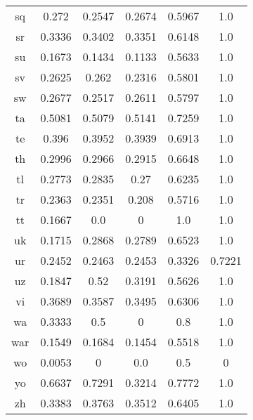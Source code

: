 \begin{figure}[h]
\begin{tabular}{cccccc}
sq&0.272&0.2547&0.2674&0.5967&1.0\\
sr&0.3336&0.3402&0.3351&0.6148&1.0\\
su&0.1673&0.1434&0.1133&0.5633&1.0\\
sv&0.2625&0.262&0.2316&0.5801&1.0\\
sw&0.2677&0.2517&0.2611&0.5797&1.0\\
ta&0.5081&0.5079&0.5141&0.7259&1.0\\
te&0.396&0.3952&0.3939&0.6913&1.0\\
th&0.2996&0.2966&0.2915&0.6648&1.0\\
tl&0.2773&0.2835&0.27&0.6235&1.0\\
tr&0.2363&0.2351&0.208&0.5716&1.0\\
tt&0.1667&0.0&0&1.0&1.0\\
uk&0.1715&0.2868&0.2789&0.6523&1.0\\
ur&0.2452&0.2463&0.2453&0.3326&0.7221\\
uz&0.1847&0.52&0.3191&0.5626&1.0\\
vi&0.3689&0.3587&0.3495&0.6306&1.0\\
wa&0.3333&0.5&0&0.8&1.0\\
war&0.1549&0.1684&0.1454&0.5518&1.0\\
wo&0.0053&0&0.0&0.5&0\\
yo&0.6637&0.7291&0.3214&0.7772&1.0\\
zh&0.3383&0.3763&0.3512&0.6405&1.0\\
\hline\hline
\end{tabular}
\end{figure}
